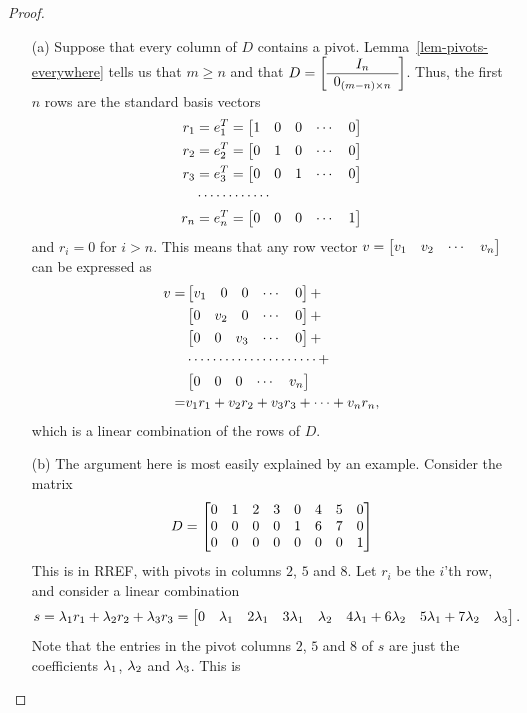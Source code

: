 \documentclass[reqno]{amsart}
\theoremstyle{definition}
\begin{document}
\begin{proof}
 \begin{itemize}
  \item[(a)] Suppose that every column of $D$ contains a pivot.
   Lemma~\ref{lem-pivots-everywhere} tells us that $m\geq n$ and that
   $D=\left[\begin{array}{c} I_n \\ \hline 0_{(m-n)\times n}\end{array}\right]$.
   Thus, the first $n$ rows are the standard basis vectors
   \begin{align*}
    r_1 &= e_1^T = \left[\begin{matrix} 1 & 0 & 0 & \cdots & 0 \end{matrix}\right] \\
    r_2 &= e_2^T = \left[\begin{matrix} 0 & 1 & 0 & \cdots & 0 \end{matrix}\right] \\
    r_3 &= e_3^T = \left[\begin{matrix} 0 & 0 & 1 & \cdots & 0 \end{matrix}\right] \\
        & \cdots\cdots\cdots\cdots \\
    r_n &= e_n^T = \left[\begin{matrix} 0 & 0 & 0 & \cdots & 1 \end{matrix}\right]
   \end{align*}
   and $r_i=0$ for $i>n$.  This means that any row vector
   $v=\left[\begin{matrix} v_1 & v_2 & \cdots & v_n\end{matrix}\right]$ can be expressed as
   \begin{align*}
    v =& \left[\begin{matrix} v_1 & 0 & 0 & \cdots & 0 \end{matrix}\right] + \\
       & \left[\begin{matrix} 0 & v_2 & 0 & \cdots & 0 \end{matrix}\right] + \\
       & \left[\begin{matrix} 0 & 0 & v_3 & \cdots & 0 \end{matrix}\right] + \\
       & \cdots\cdots\cdots\cdots\cdots\cdots\cdots + \\
       & \left[\begin{matrix} 0 & 0 & 0 & \cdots & v_n \end{matrix}\right]  \\
      =& v_1r_1 + v_2r_2 + v_3r_3 + \dotsb + v_nr_n,
   \end{align*}
   which is a linear combination of the rows of $D$.
  \item[(b)] The argument here is most easily explained by an
   example.  Consider the matrix
   \[ D = \left[\begin{matrix} 0 & 1 & 2 & 3 & 0 & 4 & 5 & 0 \\
               0 & 0 & 0 & 0 & 1 & 6 & 7 & 0 \\
               0 & 0 & 0 & 0 & 0 & 0 & 0 & 1 \end{matrix}\right]
   \]
   This is in RREF, with pivots in columns $2$, $5$ and $8$.  Let
   $r_i$ be the $i$'th row, and consider a linear combination
   \[ s = \lambda_1r_1+\lambda_2r_2+\lambda_3r_3
        = \left[\begin{matrix} 0 & \lambda_1 & 2\lambda_1 & 3\lambda_1 &
               \lambda_2 & 4\lambda_1+6\lambda_2 & 5\lambda_1+7\lambda_2 & \lambda_3 \end{matrix}\right].
   \]
   Note that the entries in the pivot columns $2$, $5$ and $8$ of $s$
   are just the coefficients $\lambda_1$, $\lambda_2$ and $\lambda_3$.  This is

\end{itemize}
\end{proof}
\end{document}

